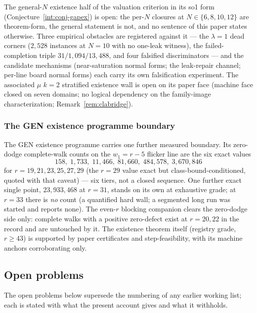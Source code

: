 The general-$N$ existence half of the valuation criterion in its so1
form (Conjecture~\ref{int:conj-gapex}) is open: the per-$N$ closures at
$N\in\{6,8,10,12\}$ are theorem-form, the general statement is not, and
no sentence of this paper states otherwise. Three empirical obstacles are
registered against it --- the $\lambda=1$ dead corners ($2{,}528$
instances at $N=10$ with no one-leak witness), the failed-completion
triple $31/1{,}094/13{,}488$, and four falsified discriminators --- and
the candidate mechanisms (near-saturation normal forms; the leak-repair
channel; per-line board normal forms) each carry its own falsification
experiment. The associated $\mu$ $k=2$ stratified existence wall is open
on its paper face (machine face closed on seven domains; no logical
dependency on the family-image characterization;
Remark~\ref{rem:clabridge}).

\subsubsection{The GEN existence programme boundary}\label{sta:subsubsec-flicker}

The GEN existence programme carries one further measured boundary. Its
zero-dodge complete-walk counts on the $w_1=r-5$ flicker line are the
six exact values
\[
158,\;1{,}733,\;11{,}466,\;81{,}660,\;484{,}578,\;3{,}670{,}846
\]
for $r=19,21,23,25,27,29$ (the $r=29$ value exact but
class-bound-conditioned, quoted with that caveat) --- six tiers, not a
closed sequence. One further exact single point, $23{,}933{,}468$ at
$r=31$, stands on its own at exhaustive grade; at $r=33$ there is
\emph{no} count (a quantified hard wall; a segmented long run was started
and reports none). The even-$r$ blocking companion clears the
zero-dodge side only: complete walks with a positive zero-defect exist at
$r=20,22$ in the record and are untouched by it. The existence theorem
itself (registry grade, $r\ge43$) is supported by paper certificates and
step-feasibility, with its machine anchors corroborating only.

\subsection{Open problems}\label{sta:subsec-open}

The open problems below supersede the numbering of any earlier working
list; each is stated with what the present account gives and what it
withholds.

